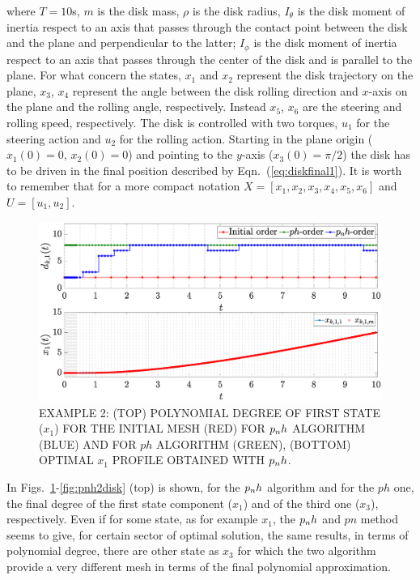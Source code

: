 where $T = 10$s, $m$ is the disk mass, $\rho$ is the disk radius, $I_{\theta}$ is the disk moment of inertia respect to an axis that passes through the contact point between the disk and the plane and perpendicular to the latter; $I_{\phi}$ is the disk moment of inertia respect to an axis that passes through the center of the disk and is parallel to the plane.
For what concern the states, $x_1$ and $x_2$ represent the disk trajectory on the plane, $x_3$, $x_4$ represent the angle between the disk rolling direction and $x$-axis on the plane and the rolling angle, respectively. Instead $x_5$, $x_6$ are the steering and rolling speed, respectively.
The disk is controlled with two torques, $u_1$ for the steering action and $u_2$ for the rolling action. Starting in the plane origin ($x_1(0) = 0, \, x_2(0) = 0$) and pointing to the $y$-axis ($x_3(0) = \pi/2$) the disk has to be driven in the final position described by 
Eqn.~(\ref{eq:diskfinal1}). It is worth to remember that for a more compact notation $X = [x_1, x_2, x_3, x_4, x_5, x_6]$  and $U = [u_1, u_2]$.
\begin{figure}[t]
	\centering
	\includegraphics[trim={1cm 0cm 2cm 0cm},clip,width=1\columnwidth]{Img/pnh1_disk1}
	\caption{EXAMPLE 2: (TOP) POLYNOMIAL DEGREE OF FIRST STATE ($x_{1}$) FOR THE INITIAL MESH (RED) FOR $p_{n}h$ ALGORITHM (BLUE) AND FOR $ph$ ALGORITHM (GREEN), (BOTTOM) 
		OPTIMAL $x_1$ PROFILE OBTAINED WITH $p_{n}h$.}
	\label{fig:pnh1disk}
\end{figure}
In Figs.~\ref{fig:pnh1disk}-\ref{fig:pnh2disk} (top) is shown, for the $p_{n}h$ algorithm and for the $ph$ one, the final degree of the first state component ($x_1$) and of the third one ($x_3$), respectively. Even if for some state, as for example $x_1$, the $p_{n}h$ and $pn$ method seems to give, for certain sector of optimal solution, the same results, in terms of polynomial degree, there are other state as $x_3$ for which the two algorithm provide a very different mesh in terms of the final polynomial approximation.
